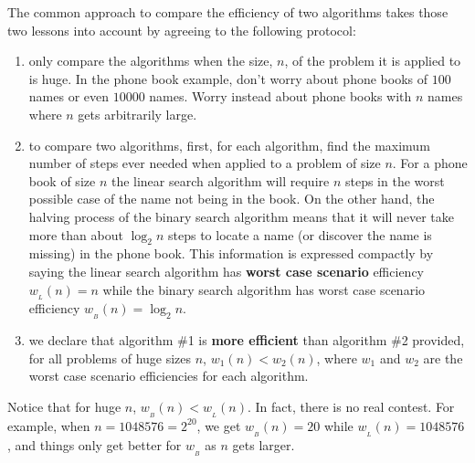 The common  approach to compare the efficiency of two algorithms takes
those two lessons into account by agreeing to the following protocol:
\begin{enumerate}
 \item only compare the algorithms
 when the size, $n$,  of the problem it is applied to is huge. 
 In the phone book example, don't worry about phone books of $100$ names
 or even $10000$ names. Worry instead about phone books with $n$ names
 where $n$ gets arbitrarily large.
 
 \item to compare two algorithms, first, for each algorithm,
  find the maximum number of steps
 ever needed when applied to a problem of size $n$. For
 a phone book  of size $n$ the linear search algorithm will require
 $n$ steps in the worst possible case of the name not being in the
 book. On the other hand, the halving process of the binary search
 algorithm means that it will never take more than about $\log_2 n$ steps
 to locate a name (or discover the name is missing) in the phone book.
 This information is expressed compactly by saying the linear search
 algorithm has {\bfseries worst case scenario} efficiency $w_{_L}(n)=n$ while
 the binary search algorithm has worst case scenario efficiency
 $w_{_B}(n) = \log_2 n$.
 
 \item we declare that algorithm \#1 is {\bfseries more efficient} than 
 algorithm \#2 provided, for all problems of huge sizes $n$, 
 $w_1(n)<w_2(n)$, where $w_1$ and $w_2$ are the worst case scenario
 efficiencies for each algorithm.
\end{enumerate}


Notice that for huge $n$, $w_{_B}(n)<w_{_L}(n)$. In fact, there is no real
contest. For example, when $n=1048576 = 2^{20}$, we get
$w_{_B}(n)=20$ while $w_{_L}(n)=1048576$, and things only get better for 
$w_{_B}$
as $n$ gets larger.

